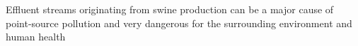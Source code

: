 Effluent streams originating from swine production can be a major cause of point-source pollution and very dangerous for the surrounding environment and human health